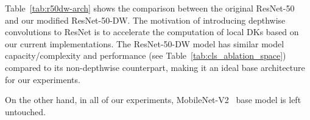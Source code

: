 \documentclass{article} \usepackage{iclr2020_conference, times}
\begin{document}
Table~\ref{tab:r50dw-arch} shows the comparison between the original
ResNet-50~\citep{he2016deep} and our modified ResNet-50-DW.
The motivation of introducing depthwise convolutions to ResNet is to accelerate
the computation of local DKs based on our current implementations.
The ResNet-50-DW model has similar model capacity/complexity and performance
(see Table~\ref{tab:cls_ablation_space}) compared to its non-depthwise
counterpart, making it an ideal base architecture
for our experiments.

On the other hand, in all of our experiments,
MobileNet-V2~\citep{sandler2018mobilenetv2} base model is left untouched.

\begin{table}
    \centering
    \renewcommand\arraystretch{1.1}
    \newcommand{\tabincell}[2]{\begin{tabular}{@{}#1@{}}#2\end{tabular}}


\end{table}
\end{document}
